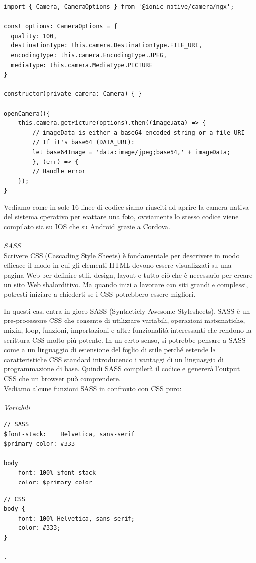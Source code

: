 \begin{lstlisting}
import { Camera, CameraOptions } from '@ionic-native/camera/ngx';

const options: CameraOptions = {
  quality: 100,
  destinationType: this.camera.DestinationType.FILE_URI,
  encodingType: this.camera.EncodingType.JPEG,
  mediaType: this.camera.MediaType.PICTURE
}

constructor(private camera: Camera) { }

openCamera(){
    this.camera.getPicture(options).then((imageData) => {
        // imageData is either a base64 encoded string or a file URI
        // If it's base64 (DATA_URL):
        let base64Image = 'data:image/jpeg;base64,' + imageData;
        }, (err) => {
        // Handle error
    });
}
\end{lstlisting}

Vediamo come in sole 16 linee di codice siamo riusciti ad aprire la camera nativa del sistema operativo per scattare
una foto, ovviamente lo stesso codice viene compilato sia su IOS che su Android grazie a Cordova.
\\\\
\textit{SASS}\\
Scrivere CSS (Cascading Style Sheets) è fondamentale per descrivere in modo efficace il modo in cui gli elementi HTML devono 
essere visualizzati su una pagina Web per definire stili, design, layout e tutto ciò che è necessario per creare un sito 
Web sbalorditivo. Ma quando inizi a lavorare con siti grandi e complessi, potresti iniziare a chiederti se i CSS potrebbero 
essere migliori. 

In questi casi entra in gioco SASS (Syntacticly Awesome Stylesheets).
SASS è un pre-processore CSS che consente di utilizzare variabili, operazioni matematiche, mixin, loop, funzioni, importazioni 
e altre funzionalità interessanti che rendono la scrittura CSS molto più potente. In un certo senso, si potrebbe pensare a 
SASS come a un linguaggio di estensione del foglio di stile perché estende le caratteristiche CSS standard introducendo i
vantaggi di un linguaggio di programmazione di base. Quindi SASS compilerà il codice e genererà l'output CSS che un
browser può comprendere. \\
Vediamo alcune funzioni SASS in confronto con CSS puro:\\\\

\textit{Variabili}
\begin{multicols}{2}
    \begin{lstlisting}
// SASS
$font-stack:    Helvetica, sans-serif
$primary-color: #333

body
    font: 100% $font-stack
    color: $primary-color
    \end{lstlisting}
    \columnbreak
    \begin{lstlisting}
// CSS
body {
    font: 100% Helvetica, sans-serif;
    color: #333;
} 

.
    \end{lstlisting}
\end{multicols}

